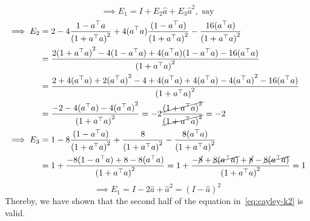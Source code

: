 \begin{equation*}
    \implies
    E_1
    =
    I
    + E_2 \widehat{a}
    + E_3 \widehat{a}^{2},
    \text{ say}
\end{equation*}
\begin{align*}
    \implies
    E_2
     & =
    2 - 4 \frac{1 - a^{\top} a}{{(1 + a^{\top} a)}^{2}} + 4 (a^{\top} a) \frac{(1 - a^{\top} a)}{{(1 + a^{\top} a)}^{2}} - \frac{16 (a^{\top} a)}{{(1 + a^{\top} a)}^{2}}
    \\ & =
    \frac{
        2 {(1 + a^{\top} a)}^{2} - 4 (1 - a^{\top} a) + 4 (a^{\top} a) (1 - a^{\top} a) - 16 (a^{\top} a)
    }{{(1 + a^{\top} a)}^{2}}
    \\ & =
    \frac{
        2 + 4 (a^{\top} a) + 2 {(a^{\top} a)}^{2} - 4 + 4 (a^{\top} a) + 4 (a^{\top} a) - 4 {(a^{\top} a)}^{2} - 16 (a^{\top} a)
    }{{(1 + a^{\top} a)}^{2}}
    \\ & =
    \frac{
        -2 - 4 (a^{\top} a) - 4 {(a^{\top} a)}^{2}
    }{{(1 + a^{\top} a)}^{2}}
    =
    -2 \frac{\cancel{{(1 + a^{\top} a)}^{2}}}{\cancel{{(1 + a^{\top} a)}^{2}}}
    =
    -2
    \\
    \implies
    E_3
     & =
    1 - 8 \frac{(1 - a^{\top} a)}{{(1 + a^{\top} a)}^{2}} + \frac{8}{{(1 + a^{\top} a)}^{2}} - \frac{8(a^{\top} a)}{{(1 + a^{\top} a)}^{2}}
    \\ & =
    1 +
    \frac{
        - 8 (1 - a^{\top} a) + 8 - 8 (a^{\top} a)
    }{{(1 + a^{\top} a)}^{2}}
    =
    1 +
    \frac{
        - \cancel{8} + \cancel{8 (a^{\top} a)} + \cancel{8} - \cancel{8 (a^{\top} a)}
    }{{(1 + a^{\top} a)}^{2}}
    =
    1
\end{align*}
\begin{equation*}
    \implies
    E_1
    =
    I - 2 \widehat{a} + \widehat{a}^{2}
    =
    {(I - \widehat{a})}^{2}
\end{equation*}
Thereby, we have shown that the second half of the equation in~\eqref{eq:cayley-k2} is valid.
